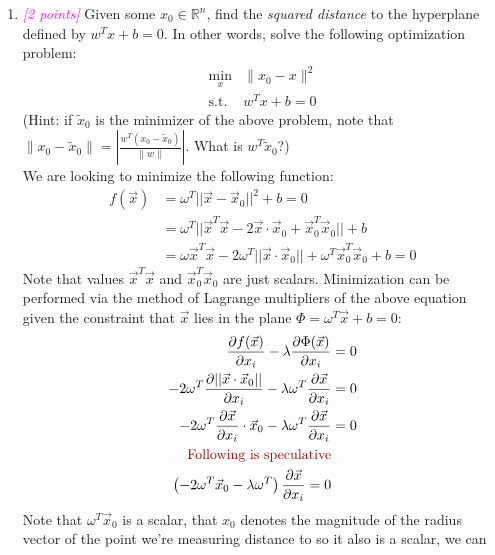 \documentclass{article}
\newcommand{\field}[1]{\mathbb{#1}}
\newcommand{\1}{\mathbf{1}}
\newcommand{\R}{\field{R}} %
\newcommand{\points}[1]{\small\textcolor{magenta}{\emph{[#1 points]}} \normalsize}
\begin{document}
\begin{enumerate}
	\item \points{2} Given some $x_0 \in \R^n$, find the \emph{squared distance} to the hyperplane defined by $w^T x + b=0$. In other words, solve the following optimization problem:
	\begin{align*}
	\min_x& \|x_0 - x \|^2\\
	\text{s.t. }&w^Tx +b = 0
	\end{align*}
	(Hint: if $\widetilde{x}_0$ is the minimizer of the above problem, note that $\| x_0 - \widetilde{x}_0 \| = | \frac{w^T(x_0 - \widetilde{x}_0)}{\|w\|} |$. What is $w^T \widetilde{x}_0$?) \\
	    We are looking to minimize the following function: 
	    \begin{align*}
	        f(\vec x) &= \omega^T||\vec x-\vec x_0||^2 + b = 0 \\
	        &= \omega^T||\vec x^T \vec x - 2\vec x\cdot \vec x_0 + \vec x_0^T \vec x_0|| + b \\
	        &= \omega\vec x^T \vec x - 2\omega^T||\vec x\cdot \vec x_0|| + \omega^T\vec x_0^T \vec x_0 + b = 0
	    \end{align*} 
	    Note that values $\vec x^T \vec x$ and $\vec x_0^T \vec x_0$ are just scalars. Minimization can be performed via the method of Lagrange multipliers of the above equation given the constraint that $\vec x$ lies in the plane $\Phi = \omega^T\vec x +b =0$:
	    \begin{align*}
	        \frac{\partial f(\vec x)}{\partial x_i} - \lambda \frac{\partial \Phi(\vec x)}{\partial x_i} &= 0 \\
	        -2\omega^T\frac{\partial ||\vec x\cdot\vec x_0||}{\partial x_i} - \lambda\omega^T \frac{\partial \vec x}{\partial x_i} &= 0 \\
	        -2\omega^T\frac{\partial \vec x}{\partial x_i}\cdot\vec x_0 - \lambda\omega^T\frac{\partial \vec x}{\partial x_i} &= 0 \\
	        \text{\color{red} Following is speculative} \\
	        \left(-2\omega^T\vec x_0 - \lambda\omega^T\right)\frac{\partial \vec x}{\partial x_i} = 0 \\
	    \end{align*}
	    Note that $\omega^T\vec x_0$ is a scalar, that $x_0$ denotes the magnitude of the radius vector of the point we're measuring distance to so it also is a scalar, we can 
\end{enumerate}
\end{document}
